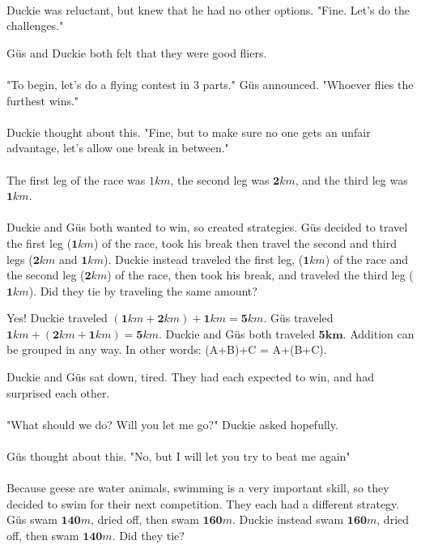 \paragraph{} Duckie was reluctant, but knew that he had no other options. "Fine. Let's do the challenges."
\vfill
\pagebreak
{}
{Güs and Duckie both felt that they were good fliers. 
\paragraph{} "To begin, let's do a flying contest in 3 parts." Güs announced. "Whoever flies the furthest wins."
\paragraph{} Duckie thought about this. "Fine, but to make sure no one gets an unfair advantage, let's allow one break in between."
\paragraph{} The first leg of the race was $1 km$, the second leg was $\mathbf{2} km$, and the third leg was $\mathbf{1} km$. 
\paragraph{} Duckie and Güs both wanted to win, so created strategies. Güs decided to travel the first leg ($\mathbf{1} km$) of the race, took his break then travel the second and third legs ($\mathbf{2} km$ and $\mathbf{1} km$). Duckie instead traveled the first leg, ($\mathbf{1} km$) of the race and the second leg ($\mathbf{2} km$) of the race, then took his break, and traveled the third leg ($\mathbf{1} km$). Did they tie by traveling the same amount?}
{Yes! Duckie traveled $(\mathbf{1} km + \mathbf{2} km) + \mathbf{1} km = \mathbf{5} km$. Güs traveled $\mathbf{1} km + (\mathbf{2} km + \mathbf{1} km) = \mathbf{5}km$. Duckie and Güs both traveled $\mathbf{5km}$.}
{Addition can be grouped in any way. In other words: (A+B)+C = A+(B+C).}
{}
{Duckie and Güs sat down, tired. They had each expected to win, and had surprised each other. 
\paragraph{} "What should we do? Will you let me go?" Duckie asked hopefully. \paragraph{} Güs thought about this. "No, but I will let you try to beat me again" 
\paragraph{} Because geese are water animals, swimming is a very important skill, so they decided to swim for their next competition. They each had a different strategy. Güs swam $\mathbf{140} m$, dried off, then swam $\mathbf{160} m$. Duckie instead swam $\mathbf{160} m$, dried off, then swam $\mathbf{140} m$. Did they tie?}

